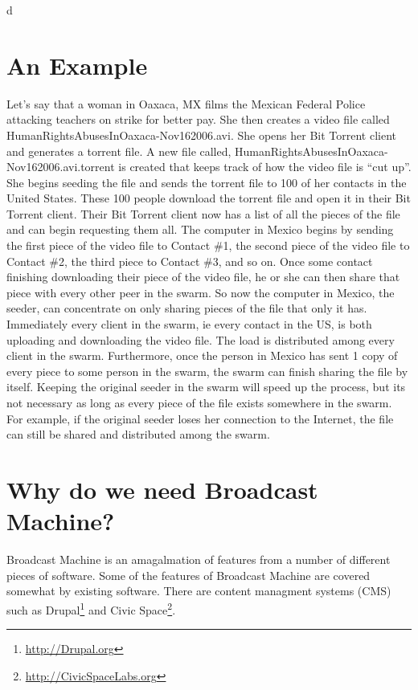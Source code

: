 d\documentclass[a4paper,12pt]{report}
\begin{document}
{{\section{An Example}
Let’s say that a woman in Oaxaca, MX films the Mexican Federal Police attacking teachers on strike for better pay. 
She then creates a video file called HumanRightsAbusesInOaxaca-Nov162006.avi. She opens her Bit Torrent client and generates a torrent file. 
A new file called, HumanRightsAbusesInOaxaca-Nov162006.avi.torrent is created that keeps track of how the video file is “cut up”. 
She begins seeding the file and sends the torrent file to 100 of her contacts in the United States.
These 100 people download the torrent file and open it in their Bit Torrent client. 
Their Bit Torrent client now has a list of all the pieces of the file and can begin requesting them all. 
The computer in Mexico begins by sending the first piece of the video file to Contact \#1, the second piece of the video file to Contact \#2, the third piece to Contact \#3, and so on. 
Once some contact finishing downloading their piece of the video file, he or she can then share that piece with every other peer in the swarm. 
So now the computer in Mexico, the seeder, can concentrate on only sharing pieces of the file that only it has. 
Immediately every client in the swarm, ie every contact in the US, is both uploading and downloading the video file. 
The load is distributed among every client in the swarm. 
Furthermore, once the person in Mexico has sent 1 copy of every piece to some person in the swarm, the swarm can finish sharing the file by itself. 
Keeping the original seeder in the swarm will speed up the process, but its not necessary as long as every piece of the file exists somewhere in the swarm. 
For example, if the original seeder loses her connection to the Internet, the file can still be shared and distributed among the swarm. 

\section {Why do we need Broadcast Machine?}
	Broadcast Machine is an amagalmation of features from a number of different pieces of software. Some of the features of Broadcast Machine are covered somewhat by existing software. There are content managment systems (CMS) such as Drupal\footnote{\url{http://Drupal.org}} and Civic Space\footnote{\url{http://CivicSpaceLabs.org}}.

}}
\end{document}
